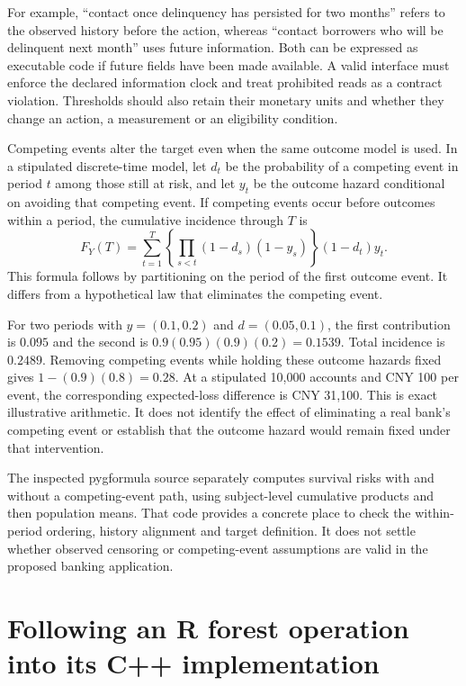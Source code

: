 For example, ``contact once delinquency has persisted for two months'' refers
to the observed history before the action, whereas ``contact borrowers who
will be delinquent next month'' uses future information. Both can be expressed
as executable code if future fields have been made available. A valid interface
must enforce the declared information clock and treat prohibited reads as a
contract violation. Thresholds should also retain their monetary units and
whether they change an action, a measurement or an eligibility condition.

Competing events alter the target even when the same outcome model is used.
In a stipulated discrete-time model, let $d_t$ be the probability of a competing
event in period $t$ among those still at risk, and let $y_t$ be the outcome
hazard conditional on avoiding that competing event. If competing events occur
before outcomes within a period, the cumulative incidence through $T$ is
\[
 F_Y(T)=\sum_{t=1}^T
 \left\{\prod_{s<t}(1-d_s)(1-y_s)\right\}(1-d_t)y_t.
\]
This formula follows by partitioning on the period of the first outcome event.
It differs from a hypothetical law that eliminates the competing event.

For two periods with $y=(0.1,0.2)$ and $d=(0.05,0.1)$, the first contribution
is $0.095$ and the second is $0.9(0.95)(0.9)(0.2)=0.1539$. Total incidence is
$0.2489$. Removing competing events while holding these outcome hazards fixed
gives $1-(0.9)(0.8)=0.28$. At a stipulated 10,000 accounts and CNY 100 per event,
the corresponding expected-loss difference is CNY 31,100. This is exact
illustrative arithmetic. It does not identify the effect of eliminating a
real bank's competing event or establish that the outcome hazard would remain
fixed under that intervention. \cite{v131_project_semantics}

The inspected pygformula source separately computes survival risks with and
without a competing-event path, using subject-level cumulative products and
then population means. That code provides a concrete place to check the
within-period ordering, history alignment and target definition. It does not
settle whether observed censoring or competing-event assumptions are valid in
the proposed banking application. \cite{v131_sw_pygformula}

\section{Following an R forest operation into its C++ implementation}

